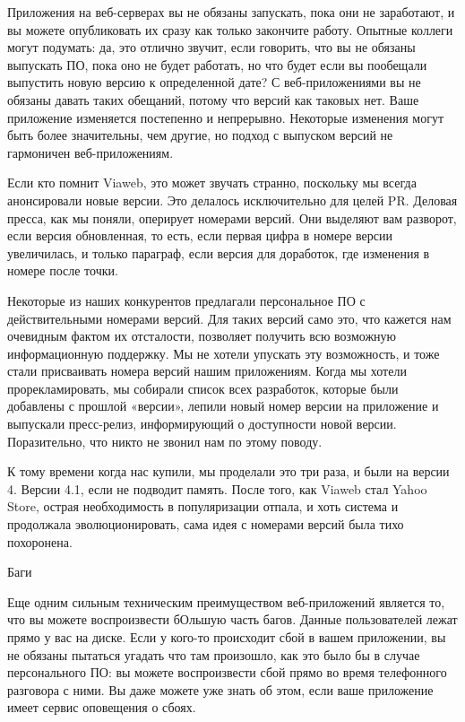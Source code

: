 \documentclass[ebook,12pt,oneside,openany]{memoir}
\begin{document}
Приложения на веб-серверах вы не обязаны запускать, пока они не
заработают, и вы можете опубликовать их сразу как только закончите
работу. Опытные коллеги могут подумать: да, это отлично звучит, если
говорить, что вы не обязаны выпускать ПО, пока оно не будет работать,
но что будет если вы пообещали выпустить новую версию к определенной
дате? С веб-приложениями вы не обязаны давать таких обещаний, потому
что версий как таковых нет. Ваше приложение изменяется постепенно и
непрерывно. Некоторые изменения могут быть более значительны, чем
другие, но подход с выпуском версий не гармоничен веб-приложениям.

Если кто помнит Viaweb, это может звучать странно, поскольку мы всегда
анонсировали новые версии. Это делалось исключительно для целей PR.
Деловая пресса, как мы поняли, оперирует номерами версий. Они выделяют
вам разворот, если версия обновленная, то есть, если первая цифра в
номере версии увеличилась, и только параграф, если версия для
доработок, где изменения в номере после точки.

Некоторые из наших конкурентов предлагали персональное ПО с
действительными номерами версий. Для таких версий само это, что
кажется нам очевидным фактом их отсталости, позволяет получить всю
возможную информационную поддержку. Мы не хотели упускать эту
возможность, и тоже стали присваивать номера версий нашим приложениям.
Когда мы хотели прорекламировать, мы собирали список всех разработок,
которые были добавлены с прошлой «версии», лепили новый номер версии
на приложение и выпускали пресс-релиз, информирующий о доступности
новой версии. Поразительно, что никто не звонил нам по этому поводу.

К тому времени когда нас купили, мы проделали это три раза, и были на
версии 4. Версии 4.1, если не подводит память. После того, как Viaweb
стал Yahoo Store, острая необходимость в популяризации отпала, и хоть
система и продолжала эволюционировать, сама идея с номерами версий
была тихо похоронена.

Баги

Еще одним сильным техническим преимуществом веб-приложений является
то, что вы можете воспроизвести бОльшую часть багов. Данные
пользователей лежат прямо у вас на диске. Если у кого-то происходит
сбой в вашем приложении, вы не обязаны пытаться угадать что там
произошло, как это было бы в случае персонального ПО: вы можете
воспроизвести сбой прямо во время телефонного разговора с ними. Вы
даже можете уже знать об этом, если ваше приложение имеет сервис
оповещения о сбоях.
\end{document}
